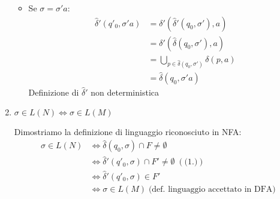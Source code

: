 \documentclass[a4paper]{article}
\begin{document}
\begin{theorem}
\begin{enumerate}
\begin{itemize}
        \item Se \( \sigma = \sigma'a \):
          \[
            \begin{aligned}
              \hat{\delta}'(q'_0, \sigma'a) &= \delta'(\hat{\delta}'(q_0, \sigma'), a)\\
                                            &= \delta'(\hat{\delta}(q_0, \sigma'), a)\\
                                            &= \bigcup_{p \in \hat{\delta}(q_0, \sigma')} \delta(p, a)\\
                                            &= \hat{\delta}(q_0, \sigma'a)
            \end{aligned}
          \] 
          Definizione di \( \hat{\delta}' \) non deterministica
      \end{itemize}
    \item
      \(
        \sigma \in L(N) \iff \sigma \in L(M)
      \) 

      \vspace{1em}
      \noindent
      Dimostriamo la definizione di linguaggio riconosciuto in NFA:
      \[
        \begin{aligned}
          \sigma \in L(N) &\iff \hat{\delta}(q_0, \sigma) \cap F \neq \emptyset\\
                          &\iff \hat{\delta}'(q'_0, \sigma) \cap F' \neq \emptyset \;(\text{(1.)})\\
                          &\iff \hat{\delta}'(q'_0, \sigma) \in F'\\
                          &\iff \sigma \in L(M) \; \text{(def. linguaggio accettato in DFA)}
        \end{aligned}
      \] 
  \end{enumerate}

\end{theorem}
\end{document}
